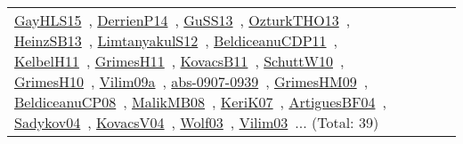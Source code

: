 {\begin{longtable}{lp{3cm}>{\raggedright\arraybackslash}p{6cm}>{\raggedright\arraybackslash}p{6cm}>{\raggedright\arraybackslash}p{8cm}}
\href{works/GayHLS15.pdf}{GayHLS15}~\cite{GayHLS15}, \href{works/DerrienP14.pdf}{DerrienP14}~\cite{DerrienP14}, \href{works/GuSS13.pdf}{GuSS13}~\cite{GuSS13}, \href{works/OzturkTHO13.pdf}{OzturkTHO13}~\cite{OzturkTHO13}, \href{works/HeinzSB13.pdf}{HeinzSB13}~\cite{HeinzSB13}, \href{works/LimtanyakulS12.pdf}{LimtanyakulS12}~\cite{LimtanyakulS12}, \href{works/BeldiceanuCDP11.pdf}{BeldiceanuCDP11}~\cite{BeldiceanuCDP11}, \href{works/KelbelH11.pdf}{KelbelH11}~\cite{KelbelH11}, \href{works/GrimesH11.pdf}{GrimesH11}~\cite{GrimesH11}, \href{works/KovacsB11.pdf}{KovacsB11}~\cite{KovacsB11}, \href{works/SchuttW10.pdf}{SchuttW10}~\cite{SchuttW10}, \href{works/GrimesH10.pdf}{GrimesH10}~\cite{GrimesH10}, \href{works/Vilim09a.pdf}{Vilim09a}~\cite{Vilim09a}, \href{works/abs-0907-0939.pdf}{abs-0907-0939}~\cite{abs-0907-0939}, \href{works/GrimesHM09.pdf}{GrimesHM09}~\cite{GrimesHM09}, \href{works/BeldiceanuCP08.pdf}{BeldiceanuCP08}~\cite{BeldiceanuCP08}, \href{works/MalikMB08.pdf}{MalikMB08}~\cite{MalikMB08}, \href{works/KeriK07.pdf}{KeriK07}~\cite{KeriK07}, \href{works/ArtiguesBF04.pdf}{ArtiguesBF04}~\cite{ArtiguesBF04}, \href{works/Sadykov04.pdf}{Sadykov04}~\cite{Sadykov04}, \href{works/KovacsV04.pdf}{KovacsV04}~\cite{KovacsV04}, \href{works/Wolf03.pdf}{Wolf03}~\cite{Wolf03}, \href{works/Vilim03.pdf}{Vilim03}~\cite{Vilim03}... (Total: 39)\\

\end{longtable}}
